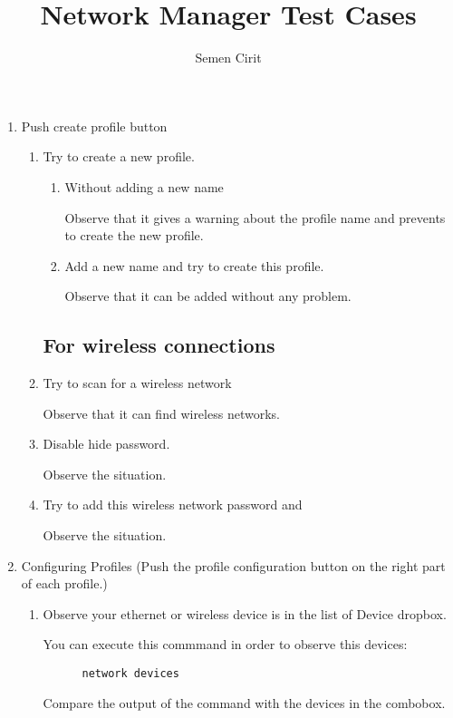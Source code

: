 \documentclass[a4paper,10pt]{article}
\title{Network Manager Test Cases}
\author{Semen Cirit}
\begin{document}
\maketitle

\begin{enumerate}
  \item Push create profile button
    \begin{enumerate}
     \subsection*{For ethernet or wireless connections}
	
      \item Try to create a new profile.
	\begin{enumerate}
	  \item  Without adding a new name

		Observe that it gives a warning about the profile name and prevents to create the new profile.
	  \item Add a new name and try to create this profile.

		Observe that it can be added without any problem.
	\end{enumerate}
      
     \subsection*{For wireless connections}
     \item Try to scan for a wireless network
      
	Observe that it can find wireless networks.
     \item Disable hide password.
        
	Observe the situation.
      \item Try to add this wireless network password and 
	
      Observe the situation.
     
     \end{enumerate}
     \item Configuring Profiles (Push the profile configuration button on the right part of each profile.)
    
      \begin{enumerate}
      \item Observe your ethernet or wireless device is in the list of Device dropbox.

	  You can execute this commmand in order to observe this devices:
	  \begin{verbatim}
	  network devices
	  \end{verbatim}
	  Compare the output of the command with the devices in the combobox.


\end{enumerate}
\end{enumerate}
\end{document}
